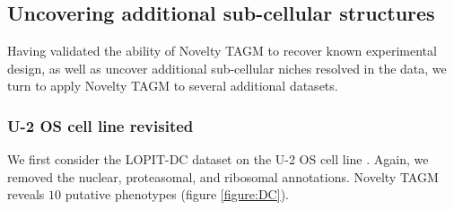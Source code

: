 \documentclass[12pt,english]{article}
\begin{document}
\subsection{Uncovering additional sub-cellular structures}
Having validated the ability of Novelty TAGM to recover known experimental design, as well as uncover additional sub-cellular niches resolved in the data, we turn to apply Novelty TAGM to several additional datasets.

\subsubsection{U-2 OS cell line revisited}
 We first consider the LOPIT-DC dataset on the U-2 OS cell line \citep{DC:2018}. Again, we removed the nuclear, proteasomal, and ribosomal annotations. Novelty TAGM reveals $10$ putative phenotypes (figure \ref{figure:DC}).
\end{document}
